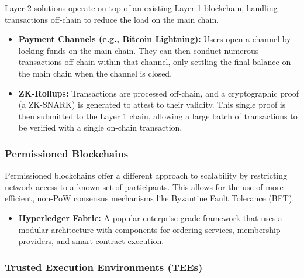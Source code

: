 Layer 2 solutions operate on top of an existing Layer 1 blockchain,
handling transactions off-chain to reduce the load on the main chain.

\begin{itemize}
\item
  \textbf{Payment Channels (e.g., Bitcoin Lightning):} Users open a
  channel by locking funds on the main chain. They can then conduct
  numerous transactions off-chain within that channel, only settling the
  final balance on the main chain when the channel is closed.

\item
  \textbf{ZK-Rollups:} Transactions are processed off-chain, and a
  cryptographic proof (a ZK-SNARK) is generated to attest to their
  validity. This single proof is then submitted to the Layer 1 chain,
  allowing a large batch of transactions to be verified with a single
  on-chain transaction.
\end{itemize}

\subsubsection{Permissioned
Blockchains}\label{permissioned-blockchains}

Permissioned blockchains offer a different approach to scalability by
restricting network access to a known set of participants. This allows
for the use of more efficient, non-PoW consensus mechanisms like
Byzantine Fault Tolerance (BFT).

\begin{itemize}
\tightlist
\item
  \textbf{Hyperledger Fabric:} A popular enterprise-grade framework that
  uses a modular architecture with components for ordering services,
  membership providers, and smart contract execution.
\end{itemize}

\subsubsection{Trusted Execution Environments
(TEEs)}\label{trusted-execution-environments-tees}


